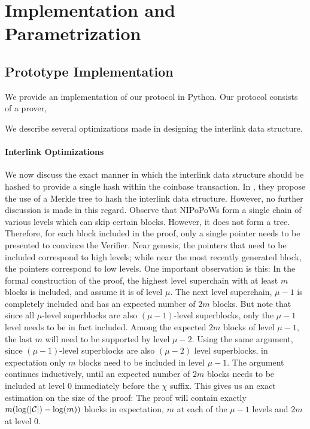\section{Implementation and Parametrization}

\subsection{Prototype Implementation}
We provide an implementation of our protocol in Python. Our protocol consists of a prover, 

We describe several optimizations made in designing the interlink data structure.

\paragraph{Interlink Optimizations}
We now discuss the exact manner in which the interlink data structure should be
hashed to provide a single hash within the coinbase transaction. In \cite{KLS},
they propose the use of a Merkle tree to hash the interlink data structure.
However, no further discussion is made in this regard. Observe that NIPoPoWs
form a single chain of various levels which can skip certain blocks. However,
it does not form a tree. Therefore, for each block included in the proof, only
a single pointer needs to be presented to convince the Verifier. Near genesis,
the pointers that need to be included correspond to high levels; while near the
most recently generated block, the pointers correspond to low levels. One
important observation is this: In the formal construction of the proof, the
highest level superchain with at least $m$ blocks is included, and assume it is
of level $\mu$. The next level superchain, $\mu - 1$ is completely included and
has an expected number of $2m$ blocks. But note that since all $\mu$-level
superblocks are also $(\mu - 1)$-level superblocks, only the $\mu - 1$ level
needs to be in fact included. Among the expected $2m$ blocks of level $\mu -
1$, the last $m$ will need to be supported by level $\mu - 2$. Using the same
argument, since $(\mu - 1)$-level superblocks are also $(\mu - 2)$ level
superblocks, in expectation only $m$ blocks need to be included in level $\mu
- 1$. The argument continues inductively, until an expected number of $2m$
blocks needs to be included at level $0$ immediately before the $\chi$ suffix.
This gives us an exact estimation on the size of the proof: The proof will
contain exactly $m (\log(|\mathcal{C}|) - \log(m))$ blocks in expectation, $m$ at each of
the $\mu - 1$ levels and $2m$ at level $0$.

